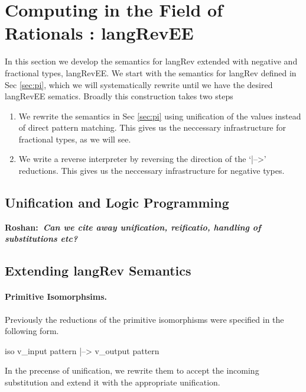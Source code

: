 \documentclass[preprint]{sigplanconf}
\newcommand{\xcomment}[2]{\textbf{#1:~\textsl{#2}}}
\newcommand{\roshan}[1]{\xcomment{Roshan}{#1}}
\begin{document}
\section{Computing in the Field of Rationals : {{langRevEE}} }
\label{sec:rat}


In this section we develop the semantics for {{langRev}} extended with
negative and fractional types, {{langRevEE}}.  We start with the
semantics for {{langRev}} defined in Sec \ref{sec:pi}, which we will
systematically rewrite until we have the desired {{langRevEE}}
sematics. Broadly this construction takes two steps 

\begin{enumerate}
\item We rewrite the semantics in Sec \ref{sec:pi} using unification
  of the values instead of direct pattern matching. This gives us the
  neccessary infrastructure for fractional types, as we will see. 

\item We write a reverse interpreter by reversing the direction of the
  `{{|-->}}' reductions. This gives us the neccessary infrastructure for
  negative types.
\end{enumerate}


\subsection{Unification and Logic Programming}

\roshan{Can we cite away unification, reificatio, handling of
  substitutions etc?}

\subsection{Extending {{langRev}} Semantics}


\paragraph{Primitive Isomorphsims.}
Previously the reductions of the primitive isomorphisms were specified
in the following form.

{{ iso v_{input pattern} |--> v_{output pattern} }}

\noindent
In the precense of unification, we rewrite them to accept the incoming
substitution and extend it with the appropriate unification.
\end{document}
